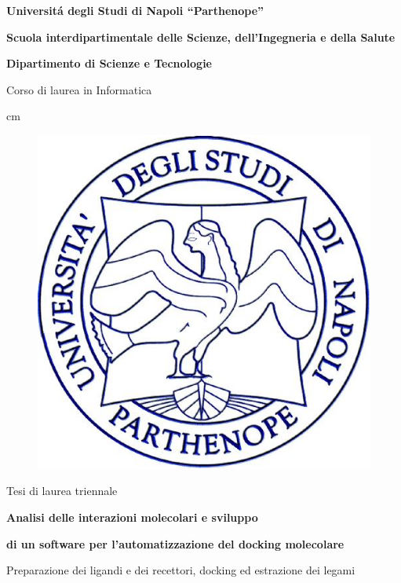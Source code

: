 \documentclass[11pt,a4paper,oneside,openright]{book}
\begin{document}
    \baselineskip 1.5cm 

    \thispagestyle{empty}

    \vskip 1cm 

    {\fontsize{18pt}{5pt}\selectfont \centerline{\bf Universit\'a degli Studi di Napoli ``Parthenope''}}
    \vskip 0.5cm
    {\fontsize{16pt}{5pt}\selectfont \centerline{\bf Scuola interdipartimentale delle Scienze, dell'Ingegneria e della Salute}
    \vskip 0.5cm
    \centerline{\bf Dipartimento di Scienze e Tecnologie}}
    \vskip 0.5cm
    {\fontsize{14pt}{5pt}\selectfont \centerline{Corso di laurea in Informatica}}

     cm

    \begin{figure}[H]
        \centering
        \includegraphics[scale=0.40]{immagini/logoParthenope.png}
        \label{fig:parthenope logo}
    \end{figure}

    \vskip 0.5cm

    {\fontsize{14pt}{5pt}\selectfont \centerline{Tesi di laurea triennale}}

    \vskip 0.5cm

    {\fontsize{18pt}{5pt} \selectfont \centerline {\bf Analisi delle interazioni molecolari e sviluppo }
    \centerline {\bf di un software per l'automatizzazione del docking molecolare}}
    \vskip 0.2cm
    {\fontsize{16pt}{5pt}\selectfont \centerline{Preparazione dei ligandi e dei recettori, docking ed estrazione dei legami}}
\end{document}

